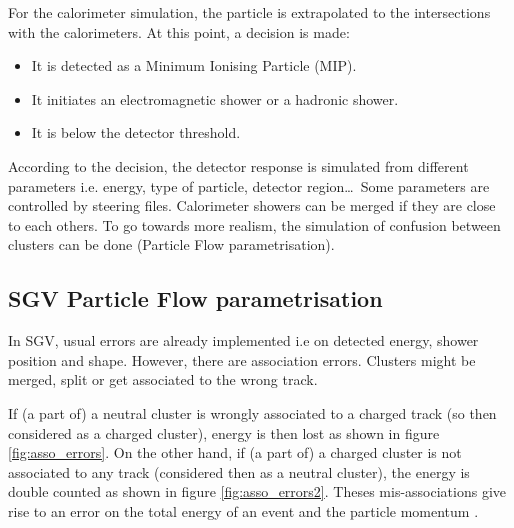 For the calorimeter simulation, the particle is extrapolated to the intersections with the calorimeters. At this point, a decision is made:

\begin{itemize}
  \item It is detected as a Minimum Ionising Particle (MIP).
  \item It initiates an electromagnetic shower or a hadronic shower.
  \item It is below the detector threshold.
\end{itemize}

According to the decision, the detector response is simulated from different parameters i.e. energy, type of particle, detector region\ldots\ Some parameters are controlled by steering files. Calorimeter showers can be merged if they are close to each others. To go towards more realism, the simulation of confusion between clusters can be done (Particle Flow parametrisation).

\subsection{SGV Particle Flow parametrisation}

In SGV, usual errors are already implemented i.e on detected energy, shower position and shape. However, there are association errors. Clusters might be merged, split or get associated to the wrong track.

If (a part of) a neutral cluster is wrongly associated to a charged track (so then considered as a charged cluster), energy is then lost as shown in figure \ref{fig:asso_errors}. On the other hand, if (a part of) a charged cluster is not associated to any track (considered then as a neutral cluster), the energy is double counted as shown in figure \ref{fig:asso_errors2}. Theses mis-associations give rise to an error on the total energy of an event and the particle momentum \cite{Chera2014}.

